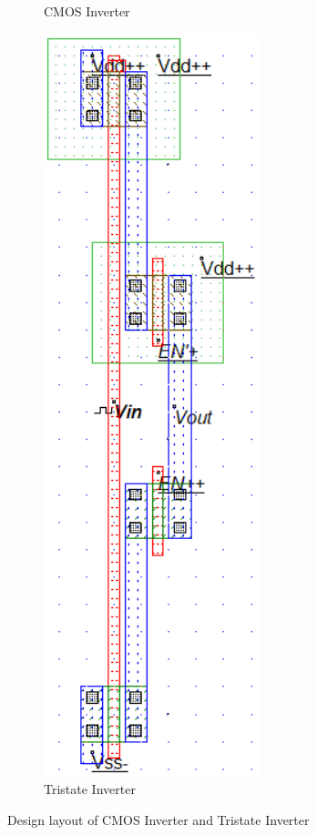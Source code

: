 \documentclass[a4paper,12pt]{article}
\begin{document}
\begin{figure}[H]
\begin{subfigure}[t]{0.49\textwidth}
	\caption{CMOS Inverter}

	\label{fig:ci1}
\end{subfigure}
\hfill
\begin{subfigure}[t]{0.49\textwidth}
	\centering
\includegraphics[width=.8\linewidth]{images/t/ti1}
\caption{Tristate Inverter}
\label{fig:ci1}
\end{subfigure}
\caption{Design layout of CMOS Inverter and Tristate Inverter}
\end{figure}
\end{document}
